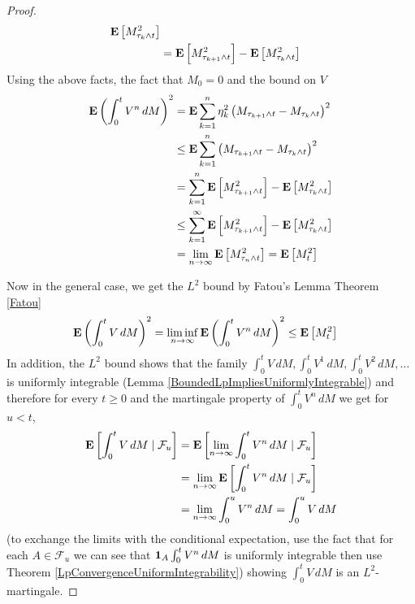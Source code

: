 \begin{proof}
\begin{align*}
\expectation{M^2_{\tau_k \wedge t}} \\
&= \expectation{M^2_{\tau_{k+1} \wedge t}} - \expectation{M^2_{\tau_k \wedge t}}
\end{align*}
Using the above facts, the fact that $M_0 = 0$ and the bound on $V$ 
\begin{align*}
\expectationop \left( \int_0^t V^n \, dM \right)^2 &= \expectationop \sum_{k=1}^n \eta^2_k \left (M_{\tau_{k+1} \wedge t} - M_{\tau_k \wedge t} \right)^2 \\
&\leq \expectationop \sum_{k=1}^n \left (M_{\tau_{k+1} \wedge t} - M_{\tau_k \wedge t} \right)^2 \\
&= \sum_{k=1}^n \expectation{M^2_{\tau_{k+1} \wedge t}} - \expectation{M^2_{\tau_k \wedge t}} \\
&\leq \sum_{k=1}^\infty \expectation{M^2_{\tau_{k+1} \wedge t}} - \expectation{M^2_{\tau_k \wedge t}} \\
&=  \lim_{n \to \infty} \expectation{M^2_{\tau_n \wedge t}} = \expectation{M^2_t}
\end{align*}

Now in the general case, we get the $L^2$ bound by Fatou's Lemma Theorem \ref{Fatou}
\begin{align*}
\expectationop \left( \int_0^t V \, dM \right)^2 &= \liminf_{n \to \infty} \expectationop  \left( \int_0^t V^n \, dM \right)^2 \leq \expectation{M^2_t}
\end{align*}
In addition, the $L^2$ bound shows that the family $\int_0^t V \, dM, \int_0^t V^1 \, dM, \int_0^t V^2 \, dM, \dotsc$ is uniformly integrable (Lemma \ref{BoundedLpImpliesUniformlyIntegrable}) and therefore for every $t \geq 0$ and the martingale property of $\int_0^t V^n \, dM$ we get for $u < t$,
\begin{align*}
\cexpectationlong{\mathcal{F}_u}{\int_0^t V \, dM} &= \cexpectationlong{\mathcal{F}_u}{\lim_{n \to \infty} \int_0^t V^n \, dM} \\
&= \lim_{n \to \infty} \cexpectationlong{\mathcal{F}_u}{ \int_0^t V^n \, dM} \\
&= \lim_{n \to \infty} \int_0^u V^n \, dM = \int_0^u V \, dM 
\end{align*}
(to exchange the limits with the conditional expectation, use the fact that for each $A \in \mathcal{F}_u$ we can see that $\characteristic{A} \int_0^t V^n \, dM$ is uniformly integrable then use Theorem \ref{LpConvergenceUniformIntegrability})
showing $\int_0^t V \, dM$ is an $L^2$-martingale.
\end{proof}

